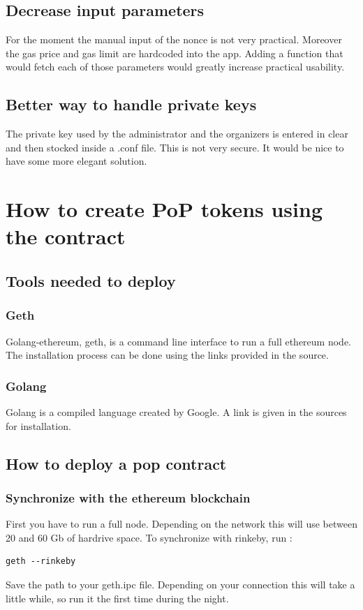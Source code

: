 \documentclass[11pt, a4paper, twoside, openright]{book} %
\begin{document}
\subsection{Decrease input parameters}
For the moment the manual input of the nonce is not very practical. Moreover the gas price and gas limit are hardcoded into the app. Adding a function that would fetch each of those parameters would greatly increase practical usability.

\subsection{Better way to handle private keys}
The private key used by the administrator and the organizers is entered in clear and then stocked inside a .conf file. This is not very secure. It would be nice to have some more elegant solution.




\section{How to create PoP tokens using the contract}

\subsection{Tools needed to deploy}
\subsubsection*{Geth}
Golang-ethereum, geth, is a command line interface to run a full ethereum node. The installation process can be done using the links provided in the source.
\subsubsection*{Golang}
Golang is a compiled language created by Google. A link is given in the sources for installation.

\subsection{How to deploy a pop contract}
\subsubsection*{Synchronize with the ethereum blockchain}
First you have to run a full node. Depending on the network this will use between 20 and 60 Gb of hardrive space. To synchronize with rinkeby, run :
\begin{verbatim}
geth --rinkeby
\end{verbatim}
Save the path to your geth.ipc file.
Depending on your connection this will take a little while, so run it the first time during the night.
\end{document}
